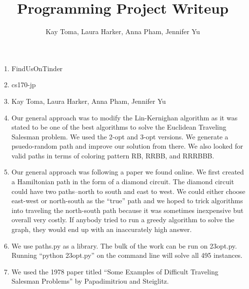 \documentclass{article}
\begin{document}
\title{Programming Project Writeup}
\author{Kay Toma, Laura Harker, Anna Pham, Jennifer Yu}

\maketitle

\begin{enumerate}
\item FindUsOnTinder
\item cs170-jp
\item Kay Toma, Laura Harker, Anna Pham, Jennifer Yu
\item Our general approach was to modify the Lin-Kernighan algorithm as it was stated to be one of the best algorithms to solve the Euclidean Traveling Salesman problem. We used the 2-opt and 3-opt versions. We generate a psuedo-random path and improve our solution from there. We also looked for valid paths in terms of coloring pattern RB, RRBB, and RRRBBB. 
\item Our general approach was following a paper we found online. We first created a Hamiltonian path in the form of a diamond circuit. The diamond circuit could have two paths--north to south and east to west. We could either choose east-west or north-south as the ``true'' path and we hoped to trick algorithms into traveling the north-south path because it was sometimes inexpensive but overall very costly. If anybody tried to run a greedy algorithm to solve the graph, they would end up with an inaccurately high answer. 
\item We use paths.py as a library. The bulk of the work can be run on 23opt.py. Running ``python 23opt.py'' on the command line will solve all 495 instances. 
\item We used the 1978 paper titled ``Some Examples of Difficult Traveling Salesman Problems'' by Papadimitriou and Steiglitz. 
\end{enumerate}
\end{document}
